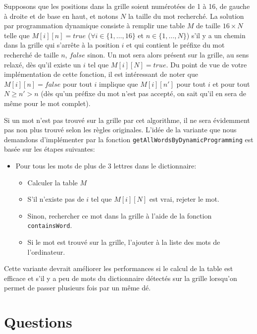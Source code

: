\documentclass[a4paper,10pt]{article}
\begin{document}
Supposons que les positions dans la grille soient numérotées de 1 à
16, de gauche à droite et de base en haut, et notons $N$ la taille du
mot recherché. La solution par programmation dynamique consiste à
remplir une table $M$ de taille $16\times N$ telle que $M[i][n]=true$
($\forall i\in\{1,\ldots,16\}$ et $n\in\{1,\ldots,N\}$) s'il y a un
chemin dans la grille qui s'arrête à la position $i$ et qui contient
le préfixe du mot recherché de taille $n$, $false$ sinon. Un mot sera
alors présent sur la grille, au sens relaxé, dès qu'il existe un $i$
tel que $M[i][N]=true$. Du point de vue de votre implémentation de
cette fonction, il est intéressant de noter que $M[i][n]=false$
pour tout $i$ implique que $M[i][n']$ pour tout $i$ et pour tout
$N\geq n'>n$ (dès qu'un préfixe du mot n'est pas accepté, on sait qu'il en
sera de même pour le mot complet).

Si un mot n'est pas trouvé sur la grille par cet algorithme, il ne
sera évidemment pas non plus trouvé selon les règles
originales. L'idée de la variante que nous demandons d'implémenter
 par la fonction \texttt{getAllWordsByDynamicProgramming} est basée sur les étapes suivantes:
\begin{itemize}
\item Pour tous les mots de plus de 3 lettres dans le dictionnaire:
\begin{itemize}
\item Calculer la table $M$
\item S'il n'existe pas de $i$ tel que $M[i][N]$ est vrai, rejeter le mot.
\item Sinon, rechercher ce mot dans la grille à l'aide de la fonction
  \texttt{containsWord}.
\item Si le mot est trouvé sur la grille, l'ajouter à la liste des mots de l'ordinateur.
\end{itemize}
\end{itemize}
Cette variante devrait améliorer les performances si le calcul de la
table est efficace et s'il y a peu de mots du dictionnaire détectés
sur la grille lorsqu'on permet de passer plusieurs fois par un même
dé.

\section{Questions}
\end{document}
